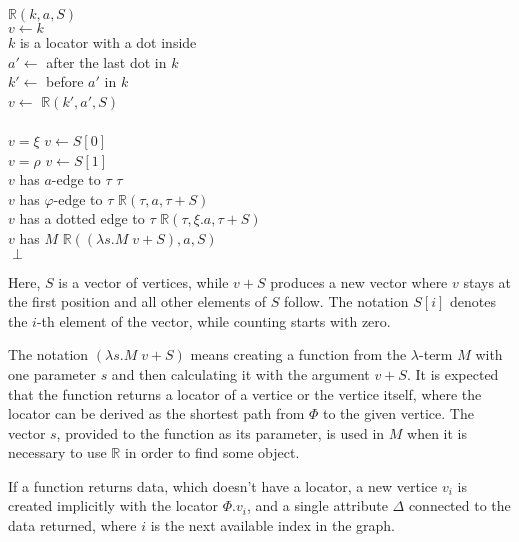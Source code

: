 \begin{twocols}
\begin{algo}
 $\mathbb{R}(k,a,S)$ \\
  \tab $v \gets k$ \\
  \tab {} $k$ is a locator with a dot inside \\
  \tab\tab $a' \gets$ after the last dot in $k$ \\
  \tab\tab $k' \gets$ before $a'$ in $k$ \\
  \tab\tab $v \gets$ $\mathbb{R}(k', a', S)$ \\
  \tab {} \\
  \tab {} $v = \xi$  $v \gets S[0]$ \\
  \tab {} $v = \rho$  $v \gets S[1]$ \\
  \tab {} $v$ has $a$-edge to $\tau$   $\tau$ \\
  \tab {} $v$ has $\varphi$-edge to $\tau$   $\mathbb{R}(\tau, a, \tau + S)$ \\
  \tab {} $v$ has a dotted edge to $\tau$   $\mathbb{R}(\tau, \xi.a, \tau + S)$ \\
  \tab {} $v$ has $M$   $\mathbb{R}((\lambda s.M \; v + S), a, S)$ \\
  \tab {} $\perp$ \\
\end{algo}
\end{twocols}

Here, $S$ is a vector of vertices, while $v+S$ produces a new vector
where $v$ stays at the first position and all other elements of $S$ follow.
The notation $S[i]$ denotes the $i$-th element of the vector, while
counting starts with zero.

The notation $(\lambda s.M \; v + S)$ means creating a function from
the $\lambda$-term $M$ with one parameter $s$ and then calculating
it with the argument $v + S$.
It is expected that the function returns a locator of a vertice or
the vertice itself, where the locator can be derived as
the shortest path from $\Phi$ to the given vertice.
The vector $s$, provided to the
function as its parameter, is used in $M$ when it is necessary
to use $\mathbb{R}$ in order to find some object.

If a function returns data, which doesn't have a locator, a new vertice
$v_i$ is created implicitly with the locator $\Phi.v_i$, and
a single attribute $\Delta$ connected to the data returned, where
$i$ is the next available index in the graph.


